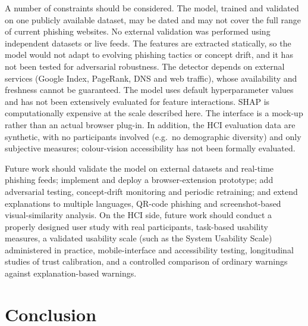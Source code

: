 \documentclass[11pt,a4paper]{article}
\begin{document}
A number of constraints should be considered. The model, trained and validated on one publicly
available dataset, may be dated and may not cover the full range of current phishing websites.
No external validation was performed using independent datasets or live feeds. The features are
extracted statically, so the model would not adapt to evolving phishing tactics or concept
drift, and it has not been tested for adversarial robustness. The detector depends on external
services (Google Index, PageRank, DNS and web traffic), whose availability and freshness cannot
be guaranteed. The model uses default hyperparameter values and has not been extensively
evaluated for feature interactions. SHAP is computationally expensive at the scale described
here. The interface is a mock-up rather than an actual browser plug-in. In addition, the HCI
evaluation data are synthetic, with no participants involved (e.g.\ no demographic diversity)
and only subjective measures; colour-vision accessibility has not been formally evaluated.

Future work should validate the model on external datasets and real-time phishing feeds;
implement and deploy a browser-extension prototype; add adversarial testing, concept-drift
monitoring and periodic retraining; and extend explanations to multiple languages, QR-code
phishing and screenshot-based visual-similarity analysis. On the HCI side, future work should
conduct a properly designed user study with real participants, task-based usability measures, a
validated usability scale (such as the System Usability Scale) administered in practice,
mobile-interface and accessibility testing, longitudinal studies of trust calibration, and a
controlled comparison of ordinary warnings against explanation-based warnings.

\section{Conclusion}
\end{document}
